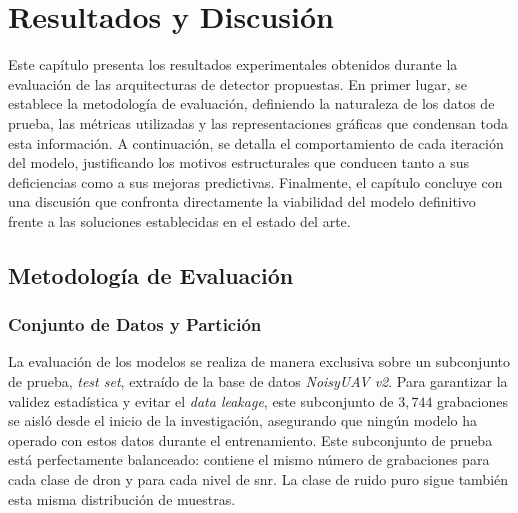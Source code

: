 \chapter{Resultados y Discusión}
\label{cap:resultados_discusion}

Este capítulo presenta los resultados experimentales obtenidos durante la evaluación de las arquitecturas de detector propuestas. En primer lugar, se establece la metodología de evaluación, definiendo la naturaleza de los datos de prueba, las métricas utilizadas y las representaciones gráficas que condensan toda esta información. A continuación, se detalla el comportamiento de cada iteración del modelo, justificando los motivos estructurales que conducen tanto a sus deficiencias como a sus mejoras predictivas. Finalmente, el capítulo concluye con una discusión que confronta directamente la viabilidad del modelo definitivo frente a las soluciones establecidas en el estado del arte.

\section{Metodología de Evaluación}
\label{sec:metodologia_evaluacion}

\subsection{Conjunto de Datos y Partición}
\label{subsec:eval_dataset}

La evaluación de los modelos se realiza de manera exclusiva sobre un subconjunto de prueba, \textit{test set}, extraído de la base de datos \textit{NoisyUAV v2}. Para garantizar la validez estadística y evitar el \textit{data leakage}, este subconjunto de $3,744$ grabaciones se aisló desde el inicio de la investigación, asegurando que ningún modelo ha operado con estos datos durante el entrenamiento. Este subconjunto de prueba está perfectamente balanceado: contiene el mismo número de grabaciones para cada clase de dron y para cada nivel de \gls{snr}. La clase de ruido puro sigue también esta misma distribución de muestras.

